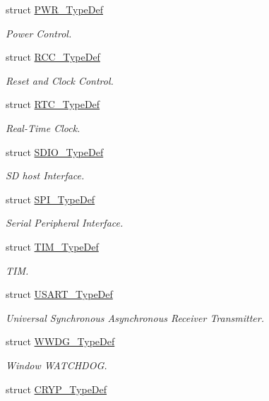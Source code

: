 \begin{DoxyCompactItemize}
struct \hyperlink{struct_p_w_r___type_def}{P\+W\+R\+\_\+\+Type\+Def}
\begin{DoxyCompactList}\small\item\em Power Control. \end{DoxyCompactList}\item 
struct \hyperlink{struct_r_c_c___type_def}{R\+C\+C\+\_\+\+Type\+Def}
\begin{DoxyCompactList}\small\item\em Reset and Clock Control. \end{DoxyCompactList}\item 
struct \hyperlink{struct_r_t_c___type_def}{R\+T\+C\+\_\+\+Type\+Def}
\begin{DoxyCompactList}\small\item\em Real-\/\+Time Clock. \end{DoxyCompactList}\item 
struct \hyperlink{struct_s_d_i_o___type_def}{S\+D\+I\+O\+\_\+\+Type\+Def}
\begin{DoxyCompactList}\small\item\em SD host Interface. \end{DoxyCompactList}\item 
struct \hyperlink{struct_s_p_i___type_def}{S\+P\+I\+\_\+\+Type\+Def}
\begin{DoxyCompactList}\small\item\em Serial Peripheral Interface. \end{DoxyCompactList}\item 
struct \hyperlink{struct_t_i_m___type_def}{T\+I\+M\+\_\+\+Type\+Def}
\begin{DoxyCompactList}\small\item\em T\+IM. \end{DoxyCompactList}\item 
struct \hyperlink{struct_u_s_a_r_t___type_def}{U\+S\+A\+R\+T\+\_\+\+Type\+Def}
\begin{DoxyCompactList}\small\item\em Universal Synchronous Asynchronous Receiver Transmitter. \end{DoxyCompactList}\item 
struct \hyperlink{struct_w_w_d_g___type_def}{W\+W\+D\+G\+\_\+\+Type\+Def}
\begin{DoxyCompactList}\small\item\em Window W\+A\+T\+C\+H\+D\+OG. \end{DoxyCompactList}\item 
struct \hyperlink{struct_c_r_y_p___type_def}{C\+R\+Y\+P\+\_\+\+Type\+Def}

\end{DoxyCompactItemize}
